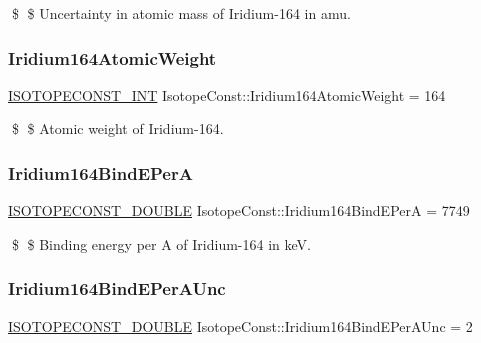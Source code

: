 \$ \$ Uncertainty in atomic mass of Iridium-\/164 in amu. \mbox{\label{group___isotope_const-_iridium-_ir164_ga0d68b8e953358c6fdb4b349413f38fea}} 
\subsubsection{\texorpdfstring{Iridium164\+Atomic\+Weight}{Iridium164AtomicWeight}}
{\footnotesize\ttfamily \mbox{\hyperlink{group___isotope_const-_macros_ga5f18360b3e99483a35c32d789e62621c}{I\+S\+O\+T\+O\+P\+E\+C\+O\+N\+S\+T\+\_\+\+I\+NT}} Isotope\+Const\+::\+Iridium164\+Atomic\+Weight = 164}

\$ \$ Atomic weight of Iridium-\/164. \mbox{\label{group___isotope_const-_iridium-_ir164_gac8e57a6a99d63b2ee2a88c7d7e78bf70}} 
\subsubsection{\texorpdfstring{Iridium164\+Bind\+E\+PerA}{Iridium164BindEPerA}}
{\footnotesize\ttfamily \mbox{\hyperlink{group___isotope_const-_macros_ga8f45a7272ce02c0b4c65c44636ed719a}{I\+S\+O\+T\+O\+P\+E\+C\+O\+N\+S\+T\+\_\+\+D\+O\+U\+B\+LE}} Isotope\+Const\+::\+Iridium164\+Bind\+E\+PerA = 7749}

\$ \$ Binding energy per A of Iridium-\/164 in keV. \mbox{\label{group___isotope_const-_iridium-_ir164_gade70227d278b6d29335c3b6dd207a87d}} 
\subsubsection{\texorpdfstring{Iridium164\+Bind\+E\+Per\+A\+Unc}{Iridium164BindEPerAUnc}}
{\footnotesize\ttfamily \mbox{\hyperlink{group___isotope_const-_macros_ga8f45a7272ce02c0b4c65c44636ed719a}{I\+S\+O\+T\+O\+P\+E\+C\+O\+N\+S\+T\+\_\+\+D\+O\+U\+B\+LE}} Isotope\+Const\+::\+Iridium164\+Bind\+E\+Per\+A\+Unc = 2}

